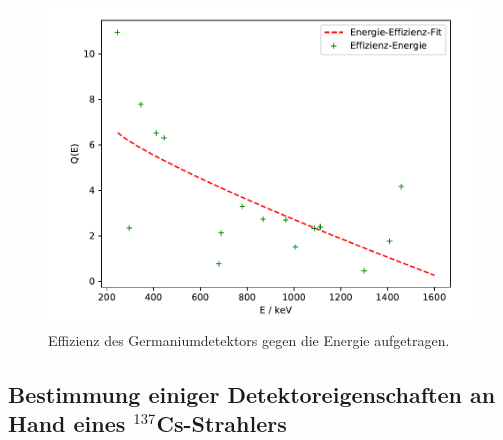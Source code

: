 \begin{figure}
    \centering
    \includegraphics[scale=0.7]{effizienz.pdf}
    \caption{Effizienz des Germaniumdetektors gegen die Energie aufgetragen.}
    \label{abb:effizienz}
\end{figure}

\subsection{Bestimmung einiger Detektoreigenschaften an Hand eines $^{137}$Cs-Strahlers}

